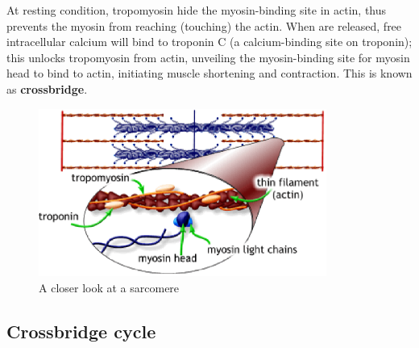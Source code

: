 At resting condition, tropomyosin hide the myosin-binding site in
actin, thus prevents the myosin from reaching (touching) the
actin. When  are released, free intracellular calcium will
bind to troponin C (a calcium-binding site on troponin); this unlocks
tropomyosin from actin, unveiling the myosin-binding site for myosin
head to bind to actin, initiating muscle shortening and
contraction. This is known as {\bf crossbridge}.

\begin{figure}[htb]
  \centerline{\includegraphics[height=5.5cm]{./images/crossbridge.eps}}
  \caption{A closer look at a sarcomere}\label{fig:crossbridge}
\end{figure}


\subsection{Crossbridge cycle}
\label{sec:crossbridge-cycle}


